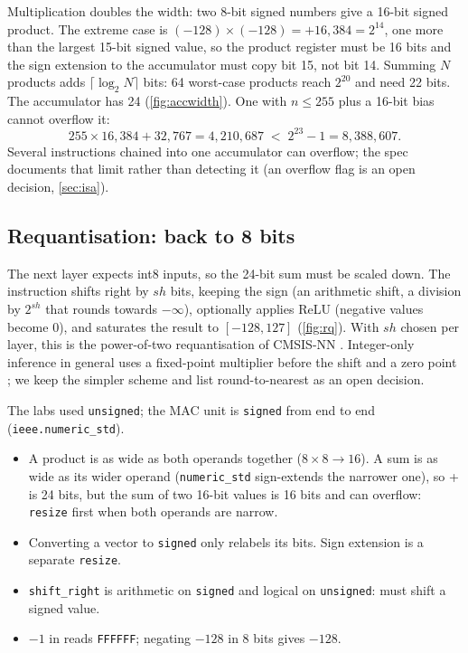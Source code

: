 Multiplication doubles the width: two 8-bit signed numbers give a 16-bit signed product. The extreme case is $(-128)\times(-128) = +16{,}384 = 2^{14}$, one more than the largest 15-bit signed value, so the product register  must be 16 bits and the sign extension to the accumulator must copy bit 15, not bit 14. Summing $N$ products adds $\lceil\log_2 N\rceil$ bits: 64 worst-case products reach $2^{20}$ and need 22 bits. The accumulator  has 24 (\cref{fig:accwidth}). One  with $n \le 255$ plus a 16-bit bias cannot overflow it:
\[
255 \times 16{,}384 + 32{,}767 = 4{,}210{,}687 \;<\; 2^{23} - 1 = 8{,}388{,}607 .
\]
Several  instructions chained into one accumulator can overflow; the spec documents that limit rather than detecting it (an overflow flag is an open decision, \cref{sec:isa}).

\subsection{Requantisation: back to 8 bits}


The next layer expects int8 inputs, so the 24-bit sum must be scaled down. The  instruction shifts  right by $sh$ bits, keeping the sign (an arithmetic shift, a division by $2^{sh}$ that rounds towards $-\infty$), optionally applies ReLU (negative values become 0), and saturates the result to $[-128, 127]$ (\cref{fig:rq}). With $sh$ chosen per layer, this is the power-of-two requantisation of CMSIS-NN \citep{lai2018cmsisnn}. Integer-only inference in general uses a fixed-point multiplier before the shift and a zero point \citep{jacob2018quantization}; we keep the simpler scheme and list round-to-nearest as an open decision.

\begin{aside}
The labs used \texttt{unsigned}; the MAC unit is \texttt{signed} from end to end (\texttt{ieee.numeric\_std}).
\begin{itemize}
\item A product is as wide as both operands together ($8\times 8 \to 16$). A sum is as wide as its wider operand (\texttt{numeric\_std} sign-extends the narrower one), so  +  is 24 bits, but the sum of two 16-bit values is 16 bits and can overflow: \texttt{resize} first when both operands are narrow.
\item Converting a vector to \texttt{signed} only relabels its bits. Sign extension is a separate \texttt{resize}.
\item \texttt{shift\_right} is arithmetic on \texttt{signed} and logical on \texttt{unsigned}:  must shift a signed value.
\item $-1$ in  reads \texttt{FFFFFF}; negating $-128$ in 8 bits gives $-128$.
\end{itemize}
\end{aside}
